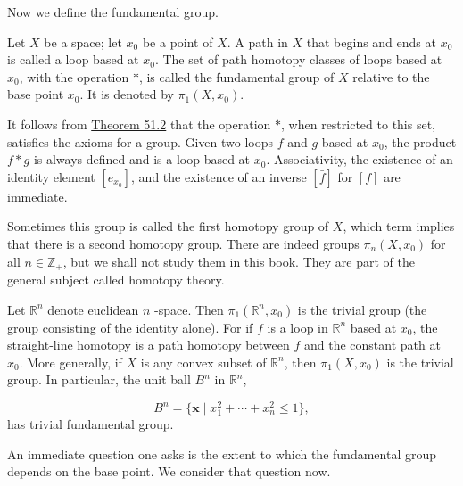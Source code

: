 Now we define the fundamental group.

\begin{definition}
Let \(X\) be a space; let \(x_{0}\) be a point of \(X\). A path in \(X\) that begins and ends at \(x_{0}\) is called a loop based at \(x_{0}\). The set of path homotopy classes of loops based at \(x_{0}\), with the operation \(*\), is called the fundamental group of \(X\) relative to the base point \(x_{0}\). It is denoted by \( {\pi }_{1}( {X,x_{0}})\).
\end{definition}

It follows from \hyperref[thm:51.2]{Theorem 51.2} that the operation \(*\), when restricted to this set, satisfies the axioms for a group. Given two loops \(f\) and \(g\) based at \(x_{0}\), the product \(f * g\) is always defined and is a loop based at \(x_{0}\). Associativity, the existence of an identity element \([ e_{x_{0}}]\), and the existence of an inverse \([ \bar{f}]\) for \([ f]\) are immediate.

Sometimes this group is called the first homotopy group of \(X\), which term implies that there is a second homotopy group. There are indeed groups \({\pi }_{n}( {X,x_{0}})\) for all \(n \in {\mathbb{Z}}_{ + }\), but we shall not study them in this book. They are part of the general subject called homotopy theory.

\begin{centeredblock}
\begin{example}
\label{ex:\thesection.\theexample}
Let \(\mathbb{R}^{n}\) denote euclidean \(n\) -space. Then \({\pi }_{1}( {\mathbb{R}^{n},x_{0}})\) is the trivial group (the group consisting of the identity alone). For if \(f\) is a loop in \(\mathbb{R}^{n}\) based at \(x_{0}\), the straight-line homotopy is a path homotopy between \(f\) and the constant path at \(x_{0}\). More generally, if \(X\) is any convex subset of \(\mathbb{R}^{n}\), then \({\pi }_{1}( {X,x_{0}})\) is the trivial group. In particular, the unit ball \(B^{n}\) in \(\mathbb{R}^{n}\),

\[
B^{n} = \{ {\mathbf{x} \mid {x}_1^{2} + \cdots + x_n^{2} \leq 1}\},
\]
has trivial fundamental group.
\end{example}
\end{centeredblock}

An immediate question one asks is the extent to which the fundamental group depends on the base point. We consider that question now.


